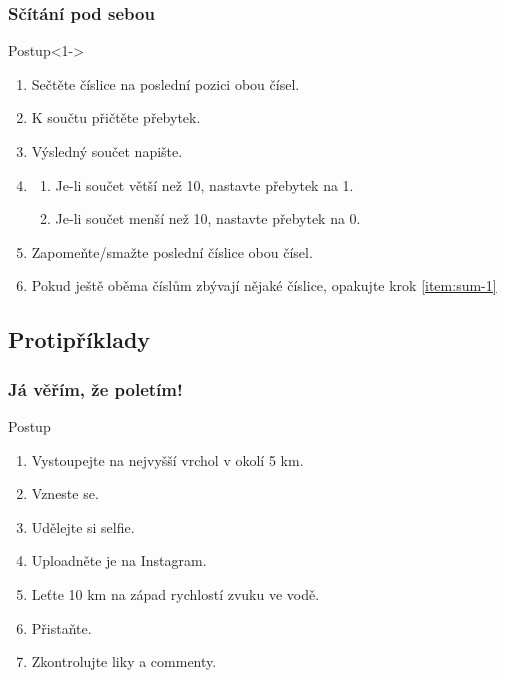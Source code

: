 \documentclass[aspectratio=169,11pt,svgnames]{beamer}
\begin{document}
\begin{frame}
 \frametitle{Sčítání pod sebou}
 \begin{block}{Postup}<1->
  \begin{enumerate}
   \item<2->\label{item:sum-1} Sečtěte číslice na poslední pozici obou čísel.
   \item<3-> K součtu přičtěte přebytek.
   \item<4-> Výsledný součet napište.
   \item<5-> 
    \begin{enumerate}
     \item Je-li součet větší než 10, nastavte přebytek na 1.
     \item Je-li součet menší než 10, nastavte přebytek na 0.
    \end{enumerate}
   \item<6-> Zapomeňte/smažte poslední číslice obou čísel.
   \item<7-> Pokud ještě oběma číslům zbývají nějaké číslice, opakujte krok
    \ref{item:sum-1}
  \end{enumerate}
 \end{block}
\end{frame}

\subsection{Protipříklady}

\begin{frame}
 \subsectionpage
\end{frame}

\begin{frame}
 \frametitle{Já věřím, že poletím!}
 \begin{block}{Postup}
  \begin{enumerate}
   \item Vystoupejte na nejvyšší vrchol v okolí 5 km.
   \item Vzneste se.
   \item Udělejte si selfie.
   \item Uploadněte je na Instagram.
   \item Leťte 10 km na západ rychlostí zvuku ve vodě.
   \item Přistaňte.
   \item Zkontrolujte liky a commenty.
  \end{enumerate}
 \end{block}
\end{frame}
\end{document}
